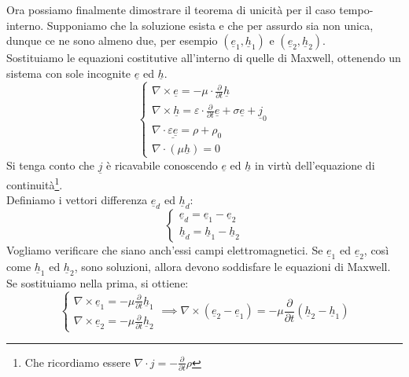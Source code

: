 \documentclass{book}
\begin{document}
        Ora possiamo finalmente dimostrare il teorema di unicità per il caso tempo-interno. 
        Supponiamo che la soluzione esista e che per assurdo sia non unica, dunque ce ne sono almeno due, per esempio $(\underline{e}_{1}, \underline{h}_{1})$ e $(\underline{e}_{2}, \underline{h}_{2})$. \\
        Sostituiamo le equazioni costitutive all'interno di quelle di Maxwell, ottenendo un sistema con sole incognite $\underline{e}$ ed $\underline{h}$.
        \begin{equation}
            \begin{cases}
            \nabla \times \underline{e} = - \displaystyle \mu \cdot \frac{\partial}{\partial t} \underline{h} \\
            \nabla \times \underline{h} = \displaystyle \varepsilon \cdot \frac{\partial}{\partial t} \underline{e} +  \sigma \underline{e} +\underline{j}_{0}\\
            \nabla \cdot \underline{\varepsilon \underline{e}} = \rho + \rho_{0} \\
            \nabla \cdot (\mu \underline{h}) =0
            \end{cases}
        \end{equation}
        Si tenga conto che $\underline{j}$ è ricavabile conoscendo $\underline{e}$ ed $\underline{h}$ in virtù dell'equazione di continuità\footnote{Che ricordiamo essere $\nabla \cdot j = - \displaystyle \frac{\partial}{\partial t}\rho $}.\\
        Definiamo i vettori differenza $\underline{e}_{d}$ ed $\underline{h}_{d}$:
        \begin{equation}
            \begin{cases}
                \underline{e}_{d} = \underline{e}_{1}-\underline{e}_{2} \\
                \underline{h}_{d} = \underline{h}_{1} - \underline{h}_{2}
            \end{cases}
        \end{equation}
        Vogliamo verificare che siano anch'essi campi elettromagnetici. Se $\underline{e}_{1}$ ed $\underline{e}_{2}$, così come $\underline{h}_{1}$ ed $\underline{h}_{2}$, sono soluzioni, allora devono soddisfare le equazioni di Maxwell. Se sostituiamo nella prima, si ottiene:
        \begin{equation}
        \begin{cases}
            \nabla \times \underline{e}_{1} = -  \displaystyle \mu \frac{\partial}{\partial t} \underline{h}_{1} \\
            \nabla \times \underline{e}_{2} = - \mu \frac{\partial}{\partial t} \underline{h}_{2}
        \end{cases} \implies \nabla \times (\underline{e}_{2}-\underline{e}_{1}) = - \mu \frac{\partial}{\partial t}(\underline{h}_{2}-\underline{h}_{1})
        \end{equation}
\end{document}
